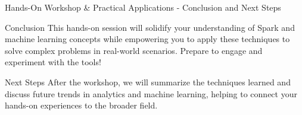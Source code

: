 \documentclass[aspectratio=169]{beamer}
\begin{document}
\begin{frame}[fragile]{Hands-On Workshop \& Practical Applications - Conclusion and Next Steps}
    \begin{block}{Conclusion}
        This hands-on session will solidify your understanding of Spark and machine learning concepts while empowering you to apply these techniques to solve complex problems in real-world scenarios. Prepare to engage and experiment with the tools!
    \end{block}
    
    \begin{block}{Next Steps}
        After the workshop, we will summarize the techniques learned and discuss future trends in analytics and machine learning, helping to connect your hands-on experiences to the broader field.
    \end{block}
\end{frame}
\end{document}
